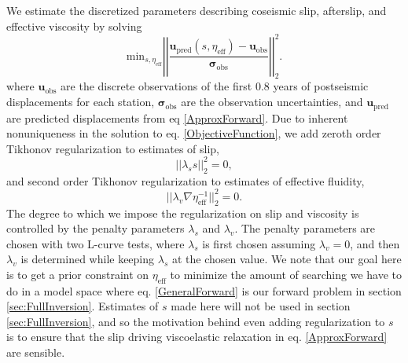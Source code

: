 \documentclass[1p]{elsarticle}
\begin{document}
We estimate the discretized parameters describing coseismic slip, afterslip, and effective viscosity by solving 
\begin{equation}\label{ObjectiveFunction}
 \mathrm{min}_{s,\eta_\mathrm{eff}} \left|\left|
 \frac{\mathbf{u_\mathrm{pred}}(s,\eta_\mathrm{eff}) - \mathbf{u_\mathrm{obs}}}
 {\mathbf{\sigma_\mathrm{obs}}}\right|\right|_2^2.
\end{equation} 
where $\mathbf{u_\mathrm{obs}}$ are the discrete observations of the first 0.8 years of postseismic displacements for each station, $\mathbf{\sigma_\mathrm{obs}}$ are the observation uncertainties, and $\mathbf{u_\mathrm{pred}}$ are predicted displacements from eq \ref{ApproxForward}.  Due to inherent nonuniqueness in the solution to eq. \ref{ObjectiveFunction}, we add zeroth order Tikhonov regularization to estimates of slip,
\begin{equation}\label{Misfit}
||\lambda_s s||_2^2=0,
\end{equation}
and second order Tikhonov regularization to estimates of effective fluidity, 
\begin{equation}
||\lambda_v \nabla \eta_{\mathrm{eff}}^{-1}||_2^2=0.
\end{equation}
The degree to which we impose the regularization on slip and viscosity is controlled by the penalty parameters $\lambda_s$ and $\lambda_v$.  The penalty parameters are chosen with two L-curve tests, where $\lambda_s$ is first chosen assuming $\lambda_v=0$, and then $\lambda_v$ is determined while keeping $\lambda_s$ at the chosen value.  We note that our goal here is to get a prior constraint on $\eta_{\mathrm{eff}}$ to minimize the amount of searching we have to do in a model space where eq. \ref{GeneralForward} is our forward problem in section \ref{sec:FullInversion}.  Estimates of $s$ made here will not be used in section \ref{sec:FullInversion}, and so the motivation behind even adding regularization to $s$ is to ensure that the slip driving viscoelastic relaxation in eq. \ref{ApproxForward} are sensible.  
\end{document}
